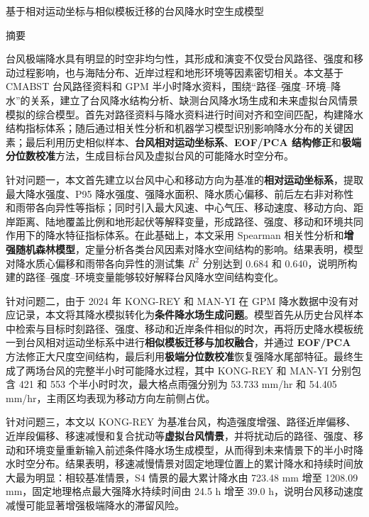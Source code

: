 \documentclass[UTF8,a4paper,zihao=5,fontset=fandol]{ctexart}
\numberwithin{equation}{section}
\numberwithin{figure}{section}
\numberwithin{table}{section}
\begin{document}
\thispagestyle{plain}

\begin{center}
  {\heiti 基于相对运动坐标与相似模板迁移的台风降水时空生成模型}\\[1.2em]
\end{center}

\begin{center}
  {\heiti 摘要}
\end{center}

台风极端降水具有明显的时空非均匀性，其形成和演变不仅受台风路径、强度和移动过程影响，也与海陆分布、近岸过程和地形环境等因素密切相关。本文基于 CMABST 台风路径资料和 GPM 半小时降水资料，围绕“路径--强度--环境--降水”的关系，建立了台风降水结构分析、缺测台风降水场生成和未来虚拟台风情景模拟的综合模型。首先对路径资料与降水资料进行时间对齐和空间匹配，构建降水结构指标体系；随后通过相关性分析和机器学习模型识别影响降水分布的关键因素；最后利用历史相似样本、\textbf{台风相对运动坐标系}、\textbf{EOF/PCA 结构修正}和\textbf{极端分位数校准}方法，生成目标台风及虚拟台风的可能降水时空分布。

针对问题一，本文首先建立以台风中心和移动方向为基准的\textbf{相对运动坐标系}，提取最大降水强度、P95 降水强度、强降水面积、降水质心偏移、前后左右非对称性和雨带各向异性等指标；同时引入最大风速、中心气压、移动速度、移动方向、距岸距离、陆地覆盖比例和地形起伏等解释变量，形成路径、强度、移动和环境共同作用下的降水特征指标体系。在此基础上，本文采用 Spearman 相关性分析和\textbf{增强随机森林模型}，定量分析各类台风因素对降水空间结构的影响。结果表明，模型对降水质心偏移和雨带各向异性的测试集 $R^2$ 分别达到 0.684 和 0.640，说明所构建的路径--强度--环境变量能够较好解释台风降水空间结构变化。

针对问题二，由于 2024 年 KONG-REY 和 MAN-YI 在 GPM 降水数据中没有对应记录，本文将其降水模拟转化为\textbf{条件降水场生成问题}。模型首先从历史台风样本中检索与目标时刻路径、强度、移动和近岸条件相似的时次，再将历史降水模板统一到台风相对运动坐标系中进行\textbf{相似模板迁移与加权融合}，并通过 \textbf{EOF/PCA} 方法修正大尺度空间结构，最后利用\textbf{极端分位数校准}恢复强降水尾部特征。最终生成了两场台风的完整半小时可能降水过程，其中 KONG-REY 和 MAN-YI 分别包含 421 和 553 个半小时时次，最大格点雨强分别为 53.733 mm/hr 和 54.405 mm/hr，主雨区均表现为移动方向左前侧占优。

针对问题三，本文以 KONG-REY 为基准台风，构造强度增强、路径近岸偏移、近岸段偏移、移速减慢和复合扰动等\textbf{虚拟台风情景}，并将扰动后的路径、强度、移动和环境变量重新输入前述条件降水场生成模型，从而得到未来情景下的半小时降水时空分布。结果表明，移速减慢情景对固定地理位置上的累计降水和持续时间放大最为明显：相较基准情景，S4 情景的最大累计降水由 723.48 mm 增至 1208.09 mm，固定地理格点最大强降水持续时间由 24.5 h 增至 39.0 h，说明台风移动速度减慢可能显著增强极端降水的滞留风险。
\end{document}
